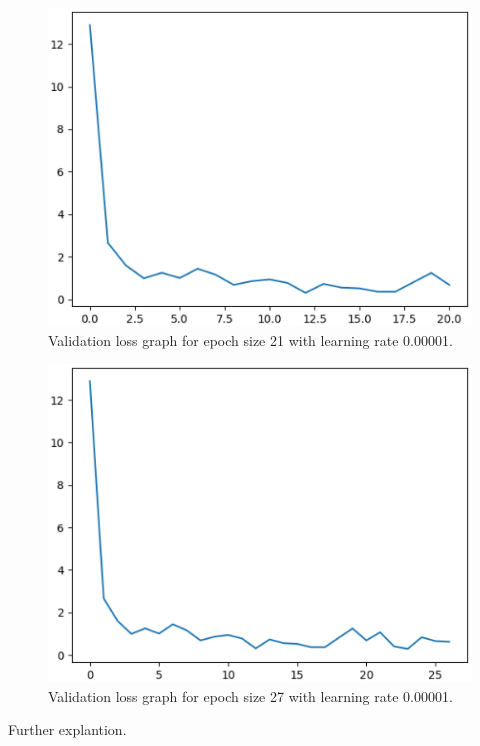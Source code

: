     \begin{figure}
    \includegraphics[width=\textwidth, scale=0.25]{5_30000.eps}
    \caption{Validation loss graph for epoch size 21 with learning rate 0.00001.} \label{Figure4}
    \end{figure}

    \begin{figure}
    \includegraphics[width=\textwidth, scale=0.25]{5_40000.eps}
    \caption{Validation loss graph for epoch size 27 with learning rate 0.00001.} \label{Figure5}
    \end{figure}

Further explantion.